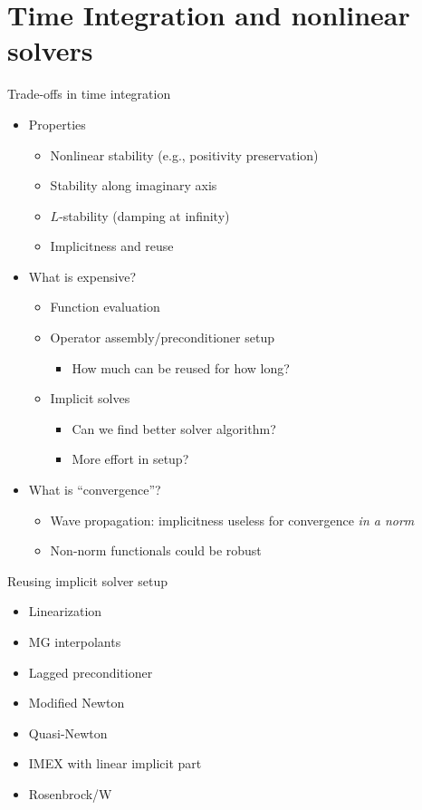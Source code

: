 \documentclass{beamer}
\begin{document}
\section{Time Integration and nonlinear solvers}
\begin{frame}{Trade-offs in time integration}
  \begin{itemize}
  \item Properties
    \begin{itemize}
    \item Nonlinear stability (e.g., positivity preservation)
    \item Stability along imaginary axis
    \item $L$-stability (damping at infinity)
    \item Implicitness and reuse
    \end{itemize}
  \item What is expensive?
    \begin{itemize}
    \item Function evaluation
    \item Operator assembly/preconditioner setup
      \begin{itemize}
      \item How much can be reused for how long?
      \end{itemize}
    \item Implicit solves
      \begin{itemize}
      \item Can we find better solver algorithm?
      \item More effort in setup?
      \end{itemize}
    \end{itemize}
  \item What is ``convergence''?
    \begin{itemize}
    \item Wave propagation: implicitness useless for convergence \emph{in a norm}
    \item Non-norm functionals could be robust
    \end{itemize}
  \end{itemize}
\end{frame}

\begin{frame}{Reusing implicit solver setup}
  \begin{itemize}
  \item Linearization
  \item MG interpolants
  \item Lagged preconditioner
  \item Modified Newton
  \item Quasi-Newton
  \item IMEX with linear implicit part
  \item Rosenbrock/W
  \end{itemize}
\end{frame}
\end{document}
